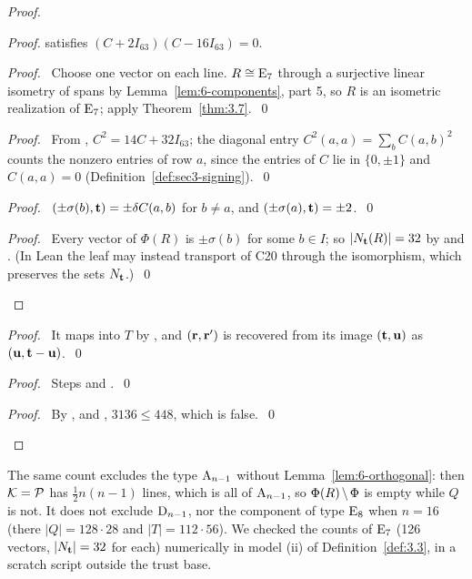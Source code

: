 \begin{proof}
\begin{proof}
{   satisfies $(C+2I_{63})(C-16I_{63})=0$.}
  \begin{proof}\pf\ Choose one vector on each line. $R\cong\mathrm{E}_7$ through a surjective
   linear isometry of spans by Lemma~\ref{lem:6-components}, part 5, so $R$ is an isometric
   realization of $\mathrm{E}_7$; apply Theorem~\ref{thm:3.7}.~\qed\end{proof}
  \begin{proof}\pf\ From , $C^2=14C+32I_{63}$; the diagonal entry
   $C^2(a,a)=\sum_bC(a,b)^2$ counts the nonzero entries of row $a$, since the entries of $C$ lie
   in $\{0,\pm1\}$ and $C(a,a)=0$ (Definition~\ref{def:sec3-signing}).~\qed\end{proof}
  \begin{proof}\pf\ $(\pm\sigma(b),{\mathbf t})=\pm\delta C(a,b)$ for $b\neq a$, and
   $(\pm\sigma(a),{\mathbf t})=\pm2$.~\qed\end{proof}
  \qedstep
  \begin{proof}\pf\ Every vector of $\Phi(R)$ is $\pm\sigma(b)$ for some $b\in I$; so
   $|N_{\mathbf t}(R)|=32$ by  and . (In Lean the leaf may instead
   transport 
   of C20 through the isomorphism, which preserves the sets $N_{\mathbf t}$.)~\qed\end{proof}
 \end{proof}
 \begin{proof}\pf\ It maps into $T$ by , and $({\mathbf r},{\mathbf r}')$ is recovered from its
  image $({\mathbf t},{\mathbf u})$ as $({\mathbf u},{\mathbf t}-{\mathbf u})$.~\qed\end{proof}
 \begin{proof}\pf\ Steps  and .~\qed\end{proof}
 \qedstep
 \begin{proof}\pf\ By ,  and , $3136\leq448$, which
  is false.~\qed\end{proof}
\end{proof}

\begin{remark}
The same count excludes the type $\mathrm{A}_{n-1}$ without Lemma~\ref{lem:6-orthogonal}: then
${\mathcal K}={\mathcal P}$ has $\frac12n(n-1)$ lines, which is all of $\mathrm{A}_{n-1}$, so $\Phi(R)\mathbin{\mkern-1.5mu\setminus\mkern-1.5mu}\Phi$ is
empty while $Q$ is not. It does not exclude $\mathrm{D}_{n-1}$, nor the component of type
$\mathrm{E}_8$ when $n=16$ (there $|Q|=128\cdot28$ and $|T|=112\cdot56$). We checked the counts of
$\mathrm{E}_7$ (126 vectors, $|N_{\mathbf t}|=32$ for each) numerically in model (ii) of
Definition~\ref{def:3.3}, in a scratch script outside the trust base.
\end{remark}

